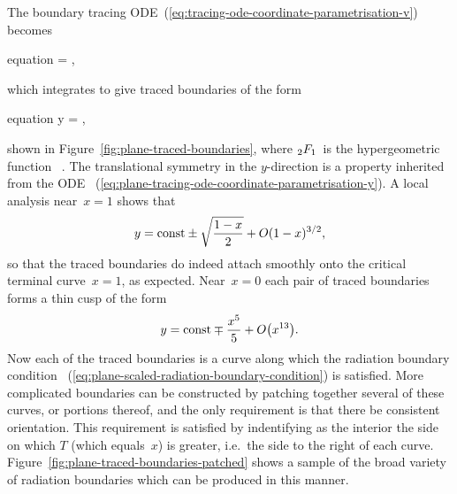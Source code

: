 The boundary tracing ODE~(\ref{eq:tracing-ode-coordinate-parametrisation-v})
becomes
\begin{important}{equation}
   = \mp {},
  \label{eq:plane-tracing-ode-coordinate-parametrisation-y}
\end{important}
which integrates to give traced boundaries of the form
\begin{important}{equation}
  y =
  \const
    \mp
    \cdot
  \hypergeo {},
  \label{eq:plane-traced-boundary}
\end{important}
shown in Figure~\ref{fig:plane-traced-boundaries},
where $\mathop{}\!{_2F_1}$~is the hypergeometric function~%
\cite{olver-2010-nist-handbook-mathematical-functions}.
The translational symmetry in the $y$-direction
is a property inherited from the ODE~%
  (\ref{eq:plane-tracing-ode-coordinate-parametrisation-y}).
A local analysis near~$x = 1$ shows that
\begin{equation}
  y = \mathrm{const} \pm \sqrt{\frac{1 - x}{2}} + \mathop{}\! O (1 - x)^{3/2},
  \label{eq:plane-traced-boundary-x-near-1}
\end{equation}
so that the traced boundaries do indeed attach smoothly
onto the critical terminal curve~$x = 1$, as expected.
Near~$x = 0$ each pair of traced boundaries forms a thin cusp of the form
\begin{equation}
  y = \const \mp \frac{x^5}{5} + \order \roundbr*{x^{13}}.
  \label{eq:plane-traced-boundary-x-near-0}
\end{equation}
Now each of the traced boundaries is a curve along which
the radiation boundary condition~%
  (\ref{eq:plane-scaled-radiation-boundary-condition})
is satisfied.
More complicated boundaries can be constructed
by patching together several of these curves, or portions thereof,
and the only requirement is that there be consistent orientation.
This requirement is satisfied by indentifying as the interior
the side on which $T$ (which equals~$x$) is greater,
i.e.~the side to the right of each curve.
Figure~\ref{fig:plane-traced-boundaries-patched} shows
a sample of the broad variety of radiation boundaries
which can be produced in this manner.

\begin{figure}
\end{figure}

